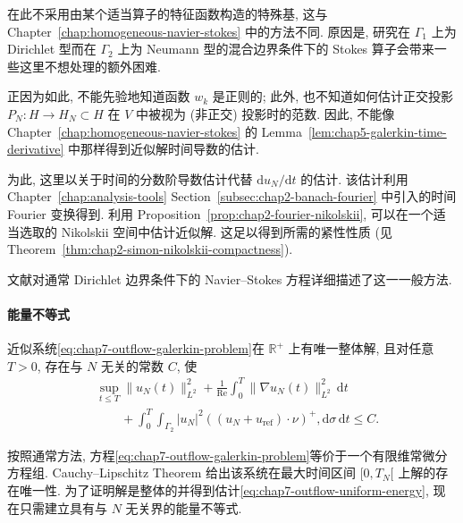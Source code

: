 \begin{sloppypar}
在此不采用由某个适当算子的特征函数构造的特殊基, 这与 Chapter~\ref{chap:homogeneous-navier-stokes} 中的方法不同. 原因是, 研究在 $\Gamma_1$ 上为 Dirichlet 型而在 $\Gamma_2$ 上为 Neumann 型的混合边界条件下的 Stokes 算子会带来一些这里不想处理的额外困难.

正因为如此, 不能先验地知道函数 $w_k$ 是正则的; 此外, 也不知道如何估计正交投影 $P_N:H\to H_N\subset H$ 在 $V$ 中被视为 (非正交) 投影时的范数. 因此, 不能像 Chapter~\ref{chap:homogeneous-navier-stokes} 的 Lemma~\ref{lem:chap5-galerkin-time-derivative} 中那样得到近似解时间导数的估计.

为此, 这里以关于时间的分数阶导数估计代替 $\mathrm du_N/\mathrm dt$ 的估计. 该估计利用 Chapter~\ref{chap:analysis-tools} Section~\ref{subsec:chap2-banach-fourier} 中引入的时间 Fourier 变换得到. 利用 Proposition~\ref{prop:chap2-fourier-nikolskii}, 可以在一个适当选取的 Nikolskii 空间中估计近似解. 这足以得到所需的紧性性质 (见 Theorem~\ref{thm:chap2-simon-nikolskii-compactness}).

文献对通常 Dirichlet 边界条件下的 Navier--Stokes 方程详细描述了这一一般方法.

\paragraph{能量不等式}
\label{subsec:chap7-outflow-energy-inequality}

\begin{Proposition}
\label{prop:chap7-outflow-galerkin-energy}
近似系统\eqref{eq:chap7-outflow-galerkin-problem}在 $\mathbb R^+$ 上有唯一整体解, 且对任意 $T>0$, 存在与 $N$ 无关的常数 $C$, 使
\begin{equation}
\begin{aligned}
 &\sup_{t\leq T}\|u_N(t)\|_{L^2}^2
 +\frac1{\operatorname{Re}}\int_0^T\|\nabla u_N(t)\|_{L^2}^2\,\mathrm dt\\
 &\qquad+\int_0^T\int_{\Gamma_2}|u_N|^2
 ((u_N+u_{\mathrm{ref}})\cdot\nu)^+,\mathrm d\sigma\,\mathrm dt
 \leq C.
\end{aligned}
\label{eq:chap7-outflow-uniform-energy}
\end{equation}
\end{Proposition}

\begin{Proof}
按照通常方法, 方程\eqref{eq:chap7-outflow-galerkin-problem}等价于一个有限维常微分方程组. Cauchy--Lipschitz Theorem 给出该系统在最大时间区间 $[0,T_N[$ 上解的存在唯一性. 为了证明解是整体的并得到估计\eqref{eq:chap7-outflow-uniform-energy}, 现在只需建立具有与 $N$ 无关界的能量不等式.


\end{Proof}
\end{sloppypar}
